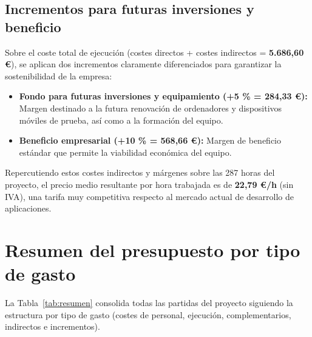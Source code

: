 \documentclass[11pt,a4paper]{article}
\begin{document}
\subsection{Incrementos para futuras inversiones y beneficio}

Sobre el coste total de ejecución (costes directos + costes indirectos = \textbf{5.686,60 €}), se aplican dos incrementos claramente diferenciados para garantizar la sostenibilidad de la empresa:

\begin{itemize}
  \item \textbf{Fondo para futuras inversiones y equipamiento (+5 \% = 284,33 €):} Margen destinado a la futura renovación de ordenadores y dispositivos móviles de prueba, así como a la formación del equipo.
  \item \textbf{Beneficio empresarial (+10 \% = 568,66 €):} Margen de beneficio estándar que permite la viabilidad económica del equipo.
\end{itemize}

Repercutiendo estos costes indirectos y márgenes sobre las 287 horas del proyecto, el precio medio resultante por hora trabajada es de \textbf{22,79 €/h} (sin IVA), una tarifa muy competitiva respecto al mercado actual de desarrollo de aplicaciones.

\newpage
\section{Resumen del presupuesto por tipo de gasto}

La Tabla~\ref{tab:resumen} consolida todas las partidas del proyecto siguiendo la estructura por tipo de gasto (costes de personal, ejecución, complementarios, indirectos e incrementos).
\end{document}
